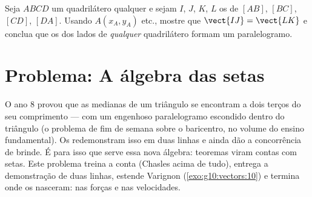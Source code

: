 \begin{exercise}[$\star\star\star$]\label{exo:g10:vectors:10}
Seja $ABCD$ um quadrilátero qualquer e sejam $I$, $J$, $K$, $L$ os
 de $[AB]$, $[BC]$, $[CD]$, $[DA]$. Usando 
$A(x_A, y_A)$ etc., mostre que $\vect{IJ} = \vect{LK}$ e conclua que os
 dos lados de \emph{qualquer} quadrilátero formam um
paralelogramo.
\end{exercise}

\section{Problema: A álgebra das setas}

\begin{problem}
\label{pb:g10:vectors:1}
O ano 8 provou que as medianas de um triângulo se encontram a dois
terços do seu comprimento --- com um engenhoso paralelogramo
escondido dentro do triângulo (o problema de fim de semana sobre o
baricentro, no volume do ensino fundamental). Os 
redemonstram isso em duas linhas e ainda dão a concorrência de
brinde. É para isso que serve essa nova álgebra: teoremas viram
contas com setas. Este problema treina a conta (Chasles acima de
tudo), entrega a demonstração de duas linhas, estende Varignon
(\cref{exo:g10:vectors:10}) e termina onde os  nasceram: nas
forças e nas velocidades.


\end{problem}
